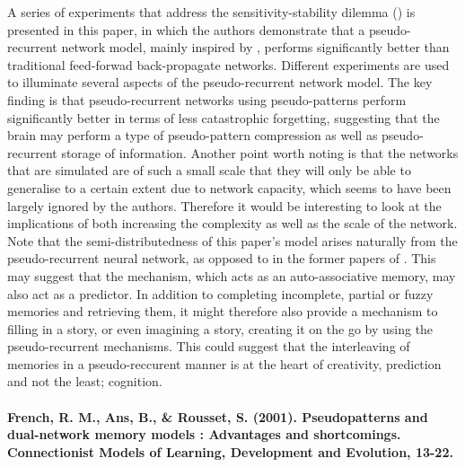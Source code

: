 A series of experiments that address the sensitivity-stability dilemma (\cite{Hebb1949}) is presented in this paper, in which the authors demonstrate that a pseudo-recurrent network model, mainly inspired by \cite{McClelland1995}, performs significantly better than traditional feed-forwad back-propagate networks. Different experiments are used to illuminate several aspects of the pseudo-recurrent network model. The key finding is that pseudo-recurrent networks using pseudo-patterns perform significantly better in terms of less catastrophic forgetting, suggesting that the brain may perform a type of pseudo-pattern compression as well as pseudo-recurrent storage of information. Another point worth noting is that the networks that are simulated are of such a small scale that they will only be able to generalise to a certain extent due to network capacity, which seems to have been largely ignored by the authors. Therefore it would be interesting to look at the implications of both increasing the complexity as well as the scale of the network. Note that the semi-distributedness of this paper's model arises naturally from the pseudo-recurrent neural network, as opposed to in the former papers of \cite{French1992, French1994}. This may suggest that the mechanism, which acts as an auto-associative memory, may also act as a predictor. In addition to completing incomplete, partial or fuzzy memories and retrieving them, it might therefore also provide a mechanism to filling in a story, or even imagining a story, creating it on the go by using the pseudo-recurrent mechanisms. This could suggest that the interleaving of memories in a pseudo-reccurent manner is at the heart of creativity, prediction and not the least; cognition.
\\
\\
\textbf{French, R. M., Ans, B., \& Rousset, S. (2001). Pseudopatterns and dual-network memory models : Advantages and shortcomings. Connectionist Models of Learning, Development and Evolution, 13-22.}

